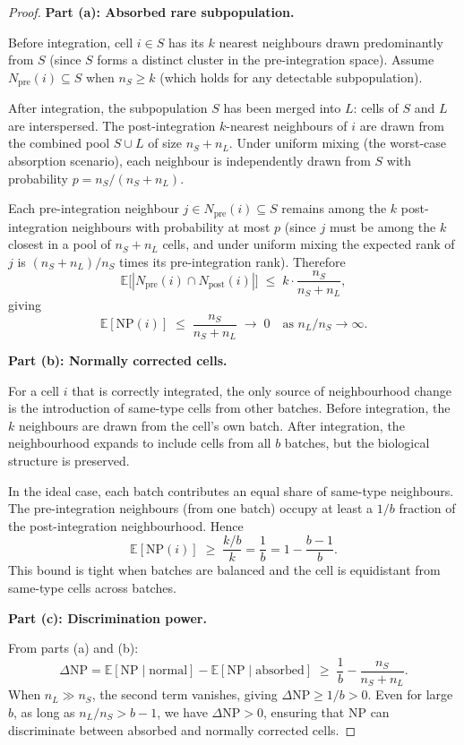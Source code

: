 \documentclass[11pt]{article}
\begin{document}
\begin{proof}
\textbf{Part (a): Absorbed rare subpopulation.}

Before integration, cell $i \in S$ has its $k$ nearest neighbours drawn
predominantly from $S$ (since $S$ forms a distinct cluster in the
pre-integration space).  Assume $N_{\mathrm{pre}}(i) \subseteq S$ when
$n_S \ge k$ (which holds for any detectable subpopulation).

After integration, the subpopulation $S$ has been merged into $L$:
cells of $S$ and $L$ are interspersed.  The post-integration $k$-nearest
neighbours of $i$ are drawn from the combined pool $S \cup L$ of size
$n_S + n_L$.  Under uniform mixing (the worst-case absorption scenario),
each neighbour is independently drawn from $S$ with probability
$p = n_S/(n_S + n_L)$.

Each pre-integration neighbour $j \in N_{\mathrm{pre}}(i) \subseteq S$
remains among the $k$ post-integration neighbours with probability at
most $p$ (since $j$ must be among the $k$ closest in a pool of
$n_S + n_L$ cells, and under uniform mixing the expected rank of $j$ is
$(n_S + n_L)/n_S$ times its pre-integration rank).  Therefore
\[
    \mathbb{E}\bigl[|N_{\mathrm{pre}}(i) \cap N_{\mathrm{post}}(i)|\bigr]
    \;\le\; k \cdot \frac{n_S}{n_S + n_L},
\]
giving
\[
    \mathbb{E}[\mathrm{NP}(i)]
    \;\le\; \frac{n_S}{n_S + n_L}
    \;\to\; 0 \quad\text{as } n_L/n_S \to \infty.
\]

\medskip
\textbf{Part (b): Normally corrected cells.}

For a cell $i$ that is correctly integrated, the only source of
neighbourhood change is the introduction of same-type cells from other
batches.  Before integration, the $k$ neighbours are drawn from the cell's
own batch.  After integration, the neighbourhood expands to include cells
from all $b$ batches, but the biological structure is preserved.

In the ideal case, each batch contributes an equal share of same-type
neighbours.  The pre-integration neighbours (from one batch) occupy at
least a $1/b$ fraction of the post-integration neighbourhood.  Hence
\[
    \mathbb{E}[\mathrm{NP}(i)]
    \;\ge\; \frac{k/b}{k}
    = \frac{1}{b}
    = 1 - \frac{b-1}{b}.
\]
This bound is tight when batches are balanced and the cell is equidistant
from same-type cells across batches.

\medskip
\textbf{Part (c): Discrimination power.}

From parts (a) and (b):
\[
    \Delta\mathrm{NP}
    = \mathbb{E}[\mathrm{NP}\mid\text{normal}]
    - \mathbb{E}[\mathrm{NP}\mid\text{absorbed}]
    \;\ge\; \frac{1}{b} - \frac{n_S}{n_S + n_L}.
\]
When $n_L \gg n_S$, the second term vanishes, giving
$\Delta\mathrm{NP} \ge 1/b > 0$.  Even for large $b$, as long as
$n_L/n_S > b - 1$, we have $\Delta\mathrm{NP} > 0$, ensuring that
NP can discriminate between absorbed and normally corrected cells.


\end{proof}
\end{document}
